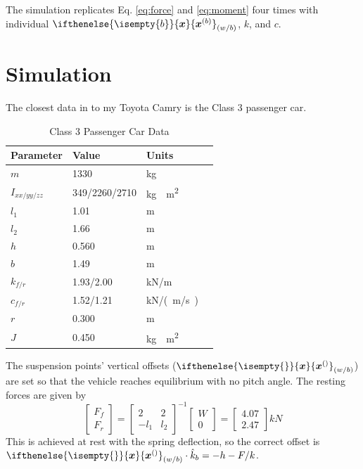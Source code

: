 \documentclass[9pt]{extarticle}
\renewcommand{\vec}[2][]{\ifthenelse{\isempty{#1}}{\boldsymbol{#2}}{\boldsymbol{#2}^{(#1)}} }
\begin{document}
\begin{multicols*}{2}
The simulation replicates Eq. \ref{eq:force} and \ref{eq:moment} four
times with individual \(\vec[b]{x}_{(w/b)}\), \(k\), and \(c\).

\section{Simulation}

The closest data in \cite{genericcar} to my Toyota Camry is the Class 3
passenger car.

\begin{table}[H]
	\centering
	\caption{Class 3 Passenger Car Data}
	\begin{tabular}{|l|l|l|l|}
		\hline
		Parameter & Value & Units \\
		\hline
		\(m\) & 1330 & \si{kg} \\
		\(I_{xx/yy/zz}\) & 349/2260/2710 & \si{kg\cdot m^2} \\
		\(l_1\) & 1.01 & \si{m} \\
		\(l_2\) & 1.66 & \si{m} \\
		\(h\) & 0.560 & \si{m} \\
		\(b\) & 1.49 & \si{m} \\
		\(k_{f/r}\) & 1.93/2.00 & \si{kN/m} \\
		\(c_{f/r}\) & 1.52/1.21 & \si{kN/(m/s)} \\
		\(r\) & 0.300 & \si{m} \\
		\(J\) & 0.450 & \si{kg \cdot m^2} \\
		\hline
	\end{tabular}
\end{table}

The suspension points' vertical offsets (\(\vec{x}_{(w/b)}\)) are set so that
the vehicle reaches equilibrium with no pitch angle. The resting forces are
given by
\begin{equation}\label{eq:equilibrium}
	\begin{bmatrix}
		F_{f} \\
		F_{r}
	\end{bmatrix} = \begin{bmatrix}
		2 & 2 \\
		-l_1 & l_2
	\end{bmatrix}^{-1} \begin{bmatrix}
		W \\ 0
	\end{bmatrix} = \begin{bmatrix}
		4.07 \\
		2.47
	\end{bmatrix} \si{kN}
\end{equation}
This is achieved at rest with the spring deflection, so the correct offset is 
\(\vec{x}_{(w/b)}\cdot \hat{k}_b = -h - F/k\).


\end{multicols*}
\end{document}
